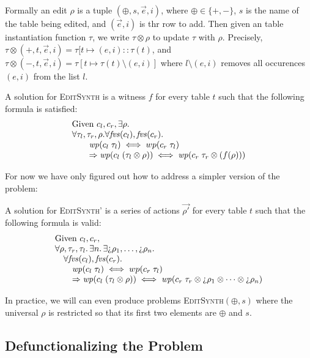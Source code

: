 
Formally an edit $\rho$ is a tuple $(\oplus,s,\vec e,i)$, where
$\oplus \in \{+,-\}$, $s$ is the name of the table being edited, and
$(\vec e, i)$ is thr row to add. Then given an table instantiation function
$\tau$, we write $\tau \otimes \rho$ to update $\tau$ with $\rho$. Precisely,
$\tau \otimes (+,t,\vec e, i) = \tau[t \mapsto (e,i)::\tau(t)$, and
$\tau \otimes (-, t, \vec e, i) = \tau[t \mapsto \tau(t) \setminus (e,i)]$ where
$l \setminus (e,i)$ removes all occurences $(e,i)$ from the list $l$.


A solution for \textsc{EditSynth} is a witness $f$ for every table $t$ such that
the following formula is satisfied:
\[\begin{array}{l}
    \text{Given } c_l,c_r, \exists \rho. \\
    \forall \tau_l,\tau_r,\rho. \forall \mathit{fvs}(c_l), \mathit{fvs}(c_r). \\
    \qquad \mathit{wp}(c_l\; \tau_l) \iff wp(c_r\; \tau_l) \\
    \qquad \Rightarrow \mathit{wp}(c_l\; (\tau_l \otimes \rho)) \iff \mathit{wp}(c_r\; \tau_r \otimes (f(\rho)))
  \end{array}\]

For now we have only figured out how to address a simpler version of the
problem:

A solution for \textsc{EditSynth'} is a series of actions $\vec{\rho'}$ for every table $t$ such that
the following formula is valid:
\[\begin{array}{l}
    \text{Given } c_l,c_r, \\
    \forall \rho, \tau_r, \tau_l.\, \exists n.\, \exists \hole\rho_1,\ldots,\hole\rho_n. \\ 
    \quad \forall \fvs(c_l), \fvs(c_r). \\
    \qquad \wp(c_l\; \tau_l) \iff wp(c_r\; \tau_l) \\
    \qquad \Rightarrow \wp(c_l\; (\tau_l \otimes \rho)) \iff \wp(c_r\; \tau_r
    \otimes \hole\rho_1 \otimes \cdots \otimes \hole\rho_n )
  \end{array}\]

In practice, we will can even produce problems \textsc{EditSynth}$(\oplus,s)$
where the universal $\rho$ is restricted so that its first two elements are
$\oplus$ and $s$.



\subsection{Defunctionalizing the Problem}

